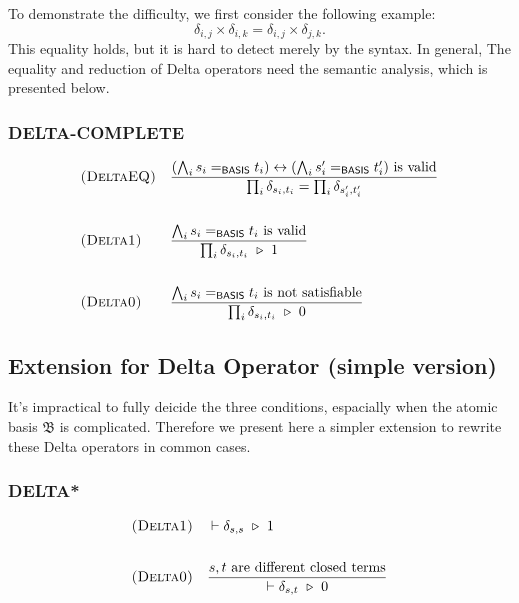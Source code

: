 To demonstrate the difficulty, we first consider the following example:
$$
\delta_{i, j} \times \delta_{i, k} = \delta_{i, j} \times \delta_{j, k}.
$$
This equality holds, but it is hard to detect merely by the syntax. In general, The equality and reduction of Delta operators need the semantic analysis, which is presented below.


\subsubsection*{\textsf{DELTA-COMPLETE}}

\begin{align*}
  & \textsc{(DeltaEQ)} && \frac{(\bigwedge_i s_i =_\textsf{BASIS} t_i) \leftrightarrow (\bigwedge_i s_i' =_\textsf{BASIS} t_i') \textrm{ is valid}}{\prod_i \delta_{s_i, t_i} = \prod_i \delta_{s_i', t_i'}} \\
  \\
  & \textsc{(Delta1)} && 
  \frac{\bigwedge_i s_i =_\textsf{BASIS} t_i \textrm{ is valid}}{ \prod_i \delta_{s_i, t_i} \ \triangleright\  1}
  \\
  \\
  & \textsc{(Delta0)} && 
  \frac{\bigwedge_i s_i =_\textsf{BASIS} t_i \textrm{ is not satisfiable}}{ \prod_i \delta_{s_i, t_i} \ \triangleright\  0}
\end{align*}



\subsection{Extension for Delta Operator (simple version)}
It's impractical to fully deicide the three conditions, espacially when the atomic basis $\mathfrak{B}$ is complicated. Therefore we present here a simpler extension to rewrite these Delta operators in common cases.

\subsubsection*{\textsf{DELTA*}}
\begin{align*}
  & \textsc{(Delta1)} && 
  \vdash \delta_{s, s} \ \triangleright\  1
  \\
  \\
  & \textsc{(Delta0)} &&
  \frac{s, t \text{ are different closed terms}}{\vdash \delta_{s, t} \ \triangleright\  0}
\end{align*}

